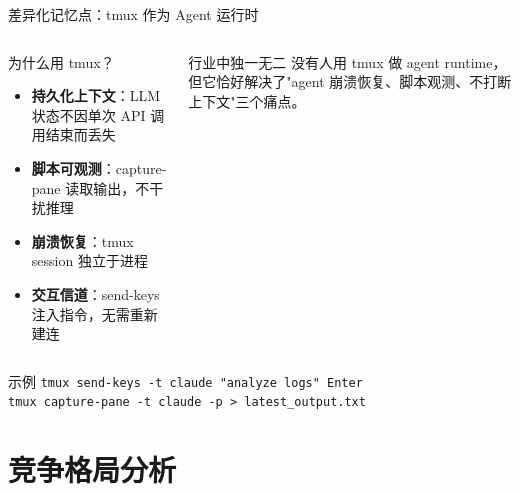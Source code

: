 \documentclass[12pt,aspectratio=169,utf8]{beamer}
\begin{document}
\begin{frame}[shrink=8]{差异化记忆点：tmux 作为 Agent 运行时}
  \begin{columns}[T]
    \begin{block}{为什么用 tmux？}
      \begin{itemize}
        \item \textbf{持久化上下文}：LLM 状态不因单次 API 调用结束而丢失
        \item \textbf{脚本可观测}：capture-pane 读取输出，不干扰推理
        \item \textbf{崩溃恢复}：tmux session 独立于进程
        \item \textbf{交互信道}：send-keys 注入指令，无需重新建连
      \end{itemize}
    \end{block}

    \begin{block}{行业中独一无二}
      没有人用 tmux 做 agent runtime，但它恰好解决了"agent 崩溃恢复、脚本观测、不打断上下文"三个痛点。
    \end{block}
  \end{columns}

  \vspace{2pt}
  \begin{exampleblock}{示例}
    \footnotesize\texttt{tmux send-keys -t claude "analyze logs" Enter}\\[0pt]
    \footnotesize\texttt{tmux capture-pane -t claude -p > latest\_output.txt}
  \end{exampleblock}
\end{frame}

\section{竞争格局分析}
\end{document}
